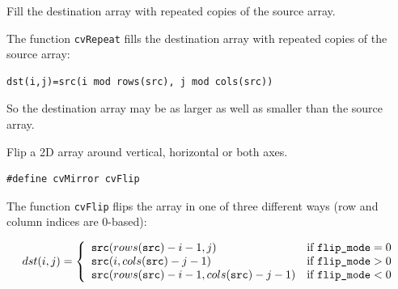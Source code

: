 \label{Repeat}

Fill the destination array with repeated copies of the source array.


\begin{description}
\end{description}


The function \texttt{cvRepeat} fills the destination array with repeated copies of the source array:

\begin{lstlisting}
dst(i,j)=src(i mod rows(src), j mod cols(src))
\end{lstlisting}

So the destination array may be as larger as well as smaller than the source array.


\label{Flip}

Flip a 2D array around vertical, horizontal or both axes.


\begin{lstlisting}
#define cvMirror cvFlip
\end{lstlisting}

\begin{description}
\end{description}

The function \texttt{cvFlip} flips the array in one of three different ways (row and column indices are 0-based):

\[
dst(i,j) = \left\{ \begin{array}{l l} \texttt{src}(rows(\texttt{src})-i-1,j) & \mbox{if $\texttt{flip\_mode} = 0$}\\ \texttt{src}(i,cols(\texttt{src})-j-1) & \mbox{if $\texttt{flip\_mode} > 0$}\\ \texttt{src}(rows(\texttt{src})-i-1,cols(\texttt{src})-j-1) & \mbox{if $\texttt{flip\_mode} < 0$}\\ \end{array} \right.
\]

